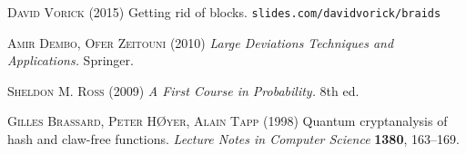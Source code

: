 \documentclass[12pt]{article}
\begin{document}
\begin{thebibliography}{9}
\textsc{David Vorick} (2015)
Getting rid of blocks.
\texttt{slides.com/davidvorick/braids}


\textsc{Amir Dembo, Ofer Zeitouni} (2010)
\textit{Large Deviations Techniques and Applications.}
Springer.

 \textsc{Sheldon M. Ross} (2009) 
\textit{A First Course in Probability.} 8th ed.

 \textsc{Gilles Brassard, Peter HØyer, Alain Tapp} (1998)
Quantum cryptanalysis of hash and claw-free functions.
\textit{Lecture Notes in Computer Science} \textbf{1380},
163--169.


\end{thebibliography}
\end{document}
